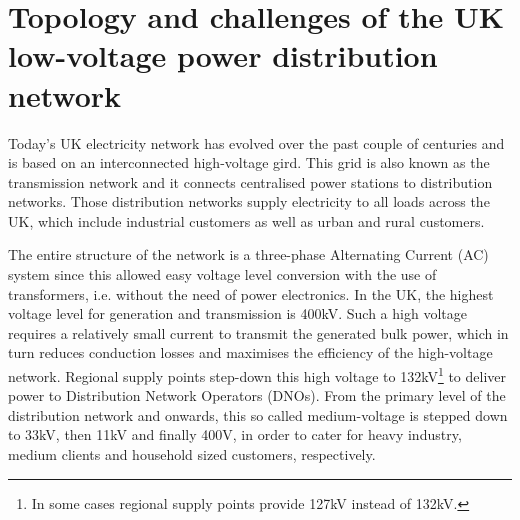 \section{Topology and challenges of the UK low-voltage power distribution network}
\label{ch-literature:sec:topology-of-lv-network}

Today's UK electricity network has evolved over the past couple of centuries and is based on an interconnected high-voltage gird.
This grid is also known as the transmission network and it connects centralised power stations to distribution networks.
Those distribution networks supply electricity to all loads across the UK, which include industrial customers as well as urban and rural customers.

The entire structure of the network is a three-phase Alternating Current (AC) system since this allowed easy voltage level conversion with the use of transformers, i.e. without the need of power electronics.
In the UK, the highest voltage level for generation and transmission is 400kV.
Such a high voltage requires a relatively small current to transmit the generated bulk power, which in turn reduces conduction losses and maximises the efficiency of the high-voltage network.
Regional supply points step-down this high voltage to 132kV\footnote{In some cases regional supply points provide 127kV instead of 132kV.} to deliver power to Distribution Network Operators (DNOs).
From the primary level of the distribution network and onwards, this so called medium-voltage is stepped down to 33kV, then 11kV and finally 400V, in order to cater for heavy industry, medium clients and household sized customers, respectively.



